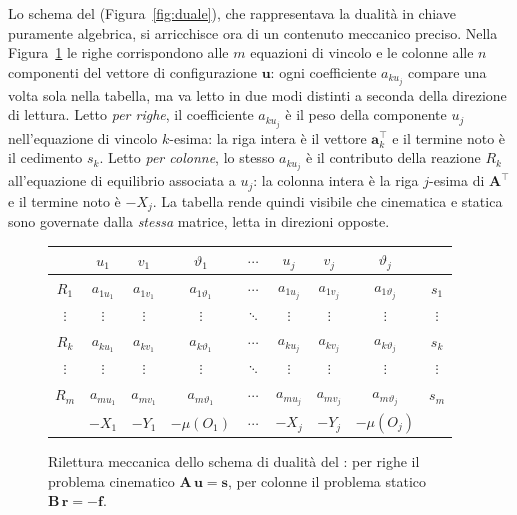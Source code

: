 Lo schema del  (Figura~\ref{fig:duale}),
che rappresentava la dualità in chiave puramente
algebrica, si arricchisce ora di un contenuto meccanico
preciso. Nella Figura~\ref{fig:duale_mec} le righe
corrispondono alle $m$ equazioni di vincolo e le colonne
alle $n$ componenti del vettore di configurazione
$\bm{u}$: ogni coefficiente $a_{ku_j}$ compare una volta
sola nella tabella, ma va letto in due modi distinti a
seconda della direzione di lettura. Letto \emph{per
	righe}, il coefficiente $a_{ku_j}$ è il peso della
componente $u_j$ nell'equazione di vincolo $k$-esima:
la riga intera è il vettore $\bm{a}_k^\top$ e il termine
noto è il cedimento $s_k$. Letto \emph{per colonne},
lo stesso $a_{ku_j}$ è il contributo della reazione $R_k$
all'equazione di equilibrio associata a $u_j$: la colonna
intera è la riga $j$-esima di $\bm{A}^\top$ e il termine
noto è $-X_j$. La tabella rende quindi visibile che
cinematica e statica sono governate dalla \emph{stessa}
matrice, letta in direzioni opposte.


\begin{figure}[htbp]
	\centering
	\renewcommand{\arraystretch}{1.3}
	\small
	\begin{tabular}{c|ccc|c|ccc|c}
		& $u_1$ & $v_1$ & $\vartheta_1$
		& $\cdots$ & $u_j$ & $v_j$ & $\vartheta_j$ & \\
		\hline
		$R_1$ & $a_{1u_1}$ & $a_{1v_1}$ & $a_{1\vartheta_1}$
		& $\cdots$ & $a_{1u_j}$ & $a_{1v_j}$ & $a_{1\vartheta_j}$ & $s_1$ \\
		$\vdots$ & $\vdots$ & $\vdots$ & $\vdots$
		& $\ddots$ & $\vdots$ & $\vdots$ & $\vdots$ & $\vdots$ \\
		$R_k$ & $a_{ku_1}$ & $a_{kv_1}$ & $a_{k\vartheta_1}$
		& $\cdots$ & $a_{ku_j}$ & $a_{kv_j}$ & $a_{k\vartheta_j}$ & $s_k$ \\
		$\vdots$ & $\vdots$ & $\vdots$ & $\vdots$
		& $\ddots$ & $\vdots$ & $\vdots$ & $\vdots$ & $\vdots$ \\
		$R_m$ & $a_{mu_1}$ & $a_{mv_1}$ & $a_{m\vartheta_1}$
		& $\cdots$ & $a_{mu_j}$ & $a_{mv_j}$ & $a_{m\vartheta_j}$ & $s_m$ \\
		\hline
		& $-X_1$ & $-Y_1$ & $-\mu(O_1)$
		& $\cdots$ & $-X_j$ & $-Y_j$ & $-\mu(O_j)$ &
	\end{tabular}
	\caption{Rilettura meccanica dello schema di dualità
		del : per righe il problema cinematico
		$\bm{A}\,\bm{u}=\bm{s}$, per colonne il problema
		statico $\bm{B}\,\bm{r}=-\bm{f}$.}
	\label{fig:duale_mec}
\end{figure}



